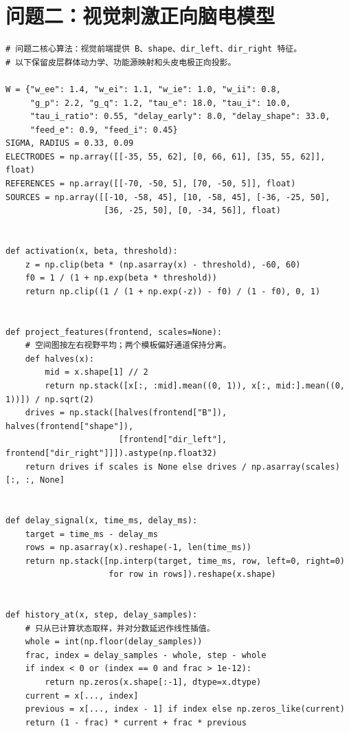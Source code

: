 \section{问题二：视觉刺激正向脑电模型}
\begin{lstlisting}[style=appendixPython]
# 问题二核心算法：视觉前端提供 B、shape、dir_left、dir_right 特征。
# 以下保留皮层群体动力学、功能源映射和头皮电极正向投影。

W = {"w_ee": 1.4, "w_ei": 1.1, "w_ie": 1.0, "w_ii": 0.8,
     "g_p": 2.2, "g_q": 1.2, "tau_e": 18.0, "tau_i": 10.0,
     "tau_i_ratio": 0.55, "delay_early": 8.0, "delay_shape": 33.0,
     "feed_e": 0.9, "feed_i": 0.45}
SIGMA, RADIUS = 0.33, 0.09
ELECTRODES = np.array([[-35, 55, 62], [0, 66, 61], [35, 55, 62]], float)
REFERENCES = np.array([[-70, -50, 5], [70, -50, 5]], float)
SOURCES = np.array([[-10, -58, 45], [10, -58, 45], [-36, -25, 50],
                    [36, -25, 50], [0, -34, 56]], float)


def activation(x, beta, threshold):
    z = np.clip(beta * (np.asarray(x) - threshold), -60, 60)
    f0 = 1 / (1 + np.exp(beta * threshold))
    return np.clip((1 / (1 + np.exp(-z)) - f0) / (1 - f0), 0, 1)


def project_features(frontend, scales=None):
    # 空间图按左右视野平均；两个模板偏好通道保持分离。
    def halves(x):
        mid = x.shape[1] // 2
        return np.stack([x[:, :mid].mean((0, 1)), x[:, mid:].mean((0, 1))]) / np.sqrt(2)
    drives = np.stack([halves(frontend["B"]), halves(frontend["shape"]),
                       [frontend["dir_left"], frontend["dir_right"]]]).astype(np.float32)
    return drives if scales is None else drives / np.asarray(scales)[:, :, None]


def delay_signal(x, time_ms, delay_ms):
    target = time_ms - delay_ms
    rows = np.asarray(x).reshape(-1, len(time_ms))
    return np.stack([np.interp(target, time_ms, row, left=0, right=0)
                     for row in rows]).reshape(x.shape)


def history_at(x, step, delay_samples):
    # 只从已计算状态取样，并对分数延迟作线性插值。
    whole = int(np.floor(delay_samples))
    frac, index = delay_samples - whole, step - whole
    if index < 0 or (index == 0 and frac > 1e-12):
        return np.zeros(x.shape[:-1], dtype=x.dtype)
    current = x[..., index]
    previous = x[..., index - 1] if index else np.zeros_like(current)
    return (1 - frac) * current + frac * previous



\end{lstlisting}
